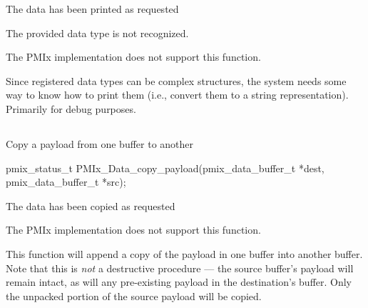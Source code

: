 \begin{constantdesc}
\item {} The data has been printed as requested
\item {} The provided data type is not recognized.
\item {} The \ac{PMIx} implementation does not support this function.
\end{constantdesc}

\descr

Since registered data types can be complex structures, the system needs some way to know how to print them (i.e., convert them to a string representation). Primarily for debug purposes.


\subsection{}

\summary

Copy a payload from one buffer to another

\format

\cspecificstart
\begin{codepar}
pmix_status_t
PMIx_Data_copy_payload(pmix_data_buffer_t *dest,
                       pmix_data_buffer_t *src);
\end{codepar}
\cspecificend

\begin{arglist}
\end{arglist}

\begin{constantdesc}
\item {} The data has been copied as requested
\item {} The \ac{PMIx} implementation does not support this function.
\end{constantdesc}

\descr

This function will append a copy of the payload in one buffer into another buffer. Note that this is \textit{not} a destructive procedure --- the source buffer's payload will remain intact, as will any pre-existing payload in the destination's buffer. Only the unpacked portion of the source payload will be copied.


